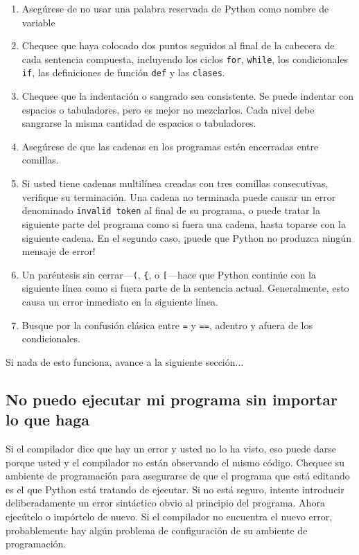 \begin{enumerate}

\item Asegúrese de no usar una palabra reservada de Python como nombre
de variable

\item Chequee que haya colocado dos puntos seguidos al final de la cabecera
de cada sentencia compuesta, incluyendo los ciclos \texttt{for}, \texttt{while},
los condicionales \texttt{if}, las definiciones de función \texttt{def} y las 
\texttt{clases}.

\item Chequee que la indentación o sangrado sea consistente.  Se puede
indentar con espacios o tabuladores, pero es mejor no mezclarlos. Cada
nivel debe sangrarse la misma cantidad de espacios o tabuladores.

\item Asegúrese de que las cadenas en los programas estén encerradas 
entre comillas.

\item Si usted tiene cadenas multilínea creadas con tres comillas consecutivas, 
verifique su terminación. Una cadena no terminada
puede causar un error denominado \texttt{invalid token} al final de su  programa,
o puede tratar la siguiente parte del programa como si fuera una
cadena, hasta toparse con la siguiente cadena.  En el segundo caso,
¡puede que Python no produzca ningún mensaje de error!

\item Un paréntesis sin cerrar---\verb+(+, \verb+{+, o \verb+[+---hace
que Python continúe con la siguiente línea como si fuera parte de la
sentencia actual. Generalmente, esto causa un error inmediato en 
la siguiente línea.

\item Busque por la confusión clásica entre \texttt{=} y  \texttt{==}, adentro
y afuera de los condicionales.

\end{enumerate}

Si nada de esto funciona, avance a la siguiente sección...


\subsection{No puedo ejecutar mi programa sin importar lo que haga}

Si el compilador dice que hay un error y usted no lo ha visto, 
eso puede darse porque usted y el compilador no están observando
el mismo código. Chequee su ambiente de programación para 
asegurarse de que el programa que está editando es el que Python
está tratando de ejecutar. Si no está seguro, intente introducir
deliberadamente un error sintáctico obvio al principio del programa.
Ahora ejecútelo o impórtelo de nuevo. Si el compilador  no encuentra
el nuevo error, probablemente hay algún problema de configuración 
de su ambiente de programación.

